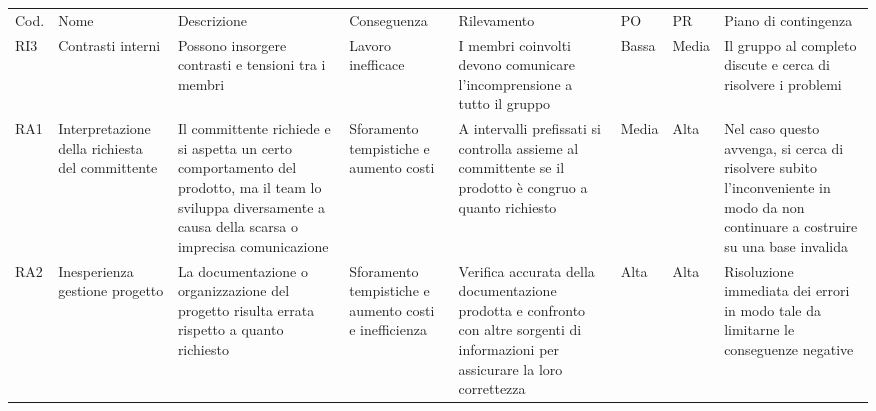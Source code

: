\begin{landscape}
\begin{table}[h]
\begin{center}
\begin{tabular}{p{0.6cm}|p{2.2cm}|p{4cm}|p{2cm}|p{4cm}|p{0.9cm}|p{0.8cm}|p{4cm}}
\end{tabular}
\end{center}
\end{table}
\begin{table}[h]
\begin{center}
\begin{tabular}{p{0.6cm}|p{2.2cm}|p{4cm}|p{2cm}|p{4cm}|p{0.9cm}|p{0.8cm}|p{4cm}}
Cod. & Nome                & Descrizione    & Conseguenza                  & Rilevamento                                                                                                                                                                    & PO & PR & Piano di contingenza                                                                                                                                                                                             \\
RI3 & Contrasti interni     & Possono insorgere contrasti e tensioni tra i membri                                                                                                                  & Lavoro inefficace                                                      & I membri coinvolti devono comunicare l’incomprensione a tutto il gruppo                                                            & Bassa & Media & Il gruppo al completo discute e cerca di risolvere i problemi  \\
RA1 & Interpretazione della richiesta del committente & Il committente richiede e si aspetta un certo comportamento del prodotto, ma il team lo sviluppa diversamente a causa della scarsa o imprecisa comunicazione & Sforamento tempistiche e aumento costi & A intervalli prefissati si controlla assieme al committente se il prodotto è congruo a quanto richiesto & Media & Alta & Nel caso questo avvenga, si cerca di risolvere subito l’inconveniente in modo da non continuare a costruire su una base invalida \\
RA2 & Inesperienza gestione progetto & La documentazione o organizzazione del progetto risulta errata rispetto a quanto richiesto & Sforamento tempistiche e aumento costi e inefficienza & Verifica accurata della documentazione prodotta e confronto con altre sorgenti di informazioni per assicurare la loro correttezza & Alta & Alta & Risoluzione immediata dei errori in modo tale da limitarne le conseguenze negative \\
                                                                                                                                                                                                                                 
\end{tabular}
\end{center}
\end{table}
\end{landscape}
